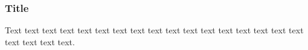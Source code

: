 \documentclass[preprint]{iucr}              %
\begin{document}
\subsubsection{Title}

Text text text text text text text text text text text text text text
text text text text text text text.









\end{document}
